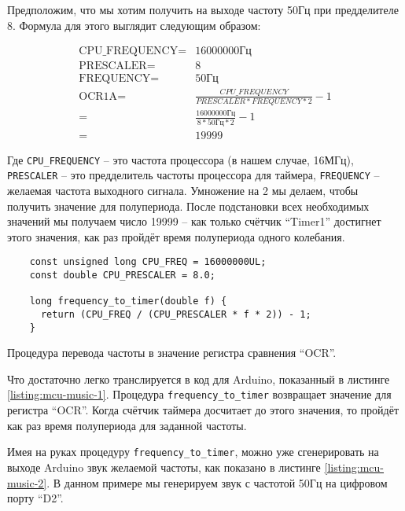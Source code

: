 \documentclass[../sparc.tex]{subfiles}
\begin{document}
Предположим, что мы хотим получить на выходе частоту 50Гц при предделителе 8.
Формула для этого выглядит следующим образом:

\begin{align}
  \mbox{CPU\_FREQUENCY} =& 16000000 \mbox{Гц} \\
  \mbox{PRESCALER} =& 8 \\
  \mbox{FREQUENCY} =& 50 \mbox{Гц} \\
  \mbox{OCR1A} =& \frac{CPU\_FREQUENCY}{PRESCALER * FREQUENCY * 2} - 1 \\
  =& \frac{16000000 \mbox{Гц}}{8 * 50 \mbox{Гц} * 2} - 1 \\
  =& 19999
  \label{equation:mcu-music-1}
\end{align}

Где \texttt{CPU\_FREQUENCY} -- это частота процессора (в нашем случае, 16МГц),
\texttt{PRESCALER} -- это предделитель частоты процессора для таймера,
\texttt{FREQUENCY} -- желаемая частота выходного сигнала.  Умножение на 2 мы
делаем, чтобы получить значение для полупериода.  После подстановки всех
необходимых значений мы получаем число 19999 -- как только счётчик ``Timer1''
достигнет этого значения, как раз пройдёт время полупериода одного колебания.

\begin{listing}[ht]
  \begin{verbatim}
    const unsigned long CPU_FREQ = 16000000UL;
    const double CPU_PRESCALER = 8.0;

    long frequency_to_timer(double f) {
      return (CPU_FREQ / (CPU_PRESCALER * f * 2)) - 1;
    }
  \end{verbatim}
  \caption{Процедура перевода частоты в значение регистра сравнения ``OCR''.}
  \label{listing:mcu-music-1}
\end{listing}

Что достаточно легко транслируется в код для Arduino, показанный в листинге
\ref{listing:mcu-music-1}.  Процедура \texttt{frequency_to_timer}
возвращает значение для регистра ``OCR''.  Когда счётчик таймера досчитает до
этого значения, то пройдёт как раз время полупериода для заданной частоты.

Имея на руках процедуру \texttt{frequency_to_timer}, можно уже
сгенерировать на выходе Arduino звук желаемой частоты, как показано в листинге
\ref{listing:mcu-music-2}.  В данном примере мы генерируем звук с частотой 50Гц
на цифровом порту ``D2''.
\end{document}
